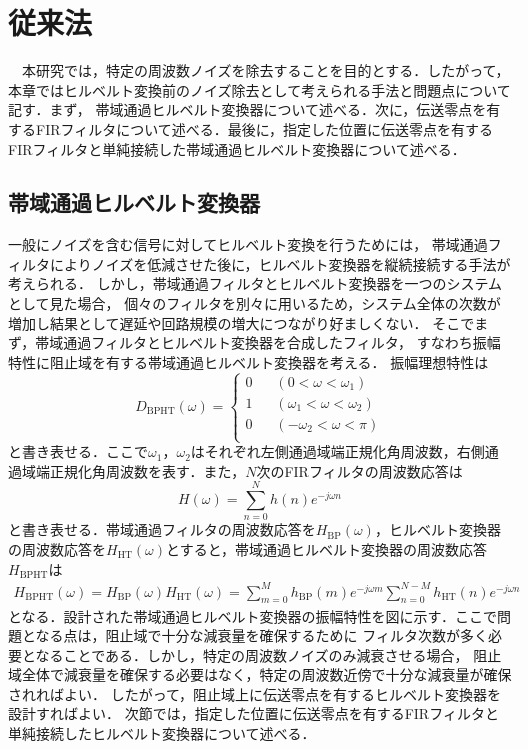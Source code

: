 \chapter{従来法}
　本研究では，特定の周波数ノイズを除去することを目的とする．したがって，本章ではヒルベルト変換前のノイズ除去として考えられる手法と問題点について記す．まず，%
帯域通過ヒルベルト変換器について述べる．次に，伝送零点を有するFIRフィルタについて述べる．最後に，指定した位置に伝送零点を有するFIRフィルタと単純接続した帯域通過ヒルベルト変換器について述べる．
\section{帯域通過ヒルベルト変換器}
一般にノイズを含む信号に対してヒルベルト変換を行うためには，
帯域通過フィルタによりノイズを低減させた後に，ヒルベルト変換器を縦続接続する手法が考えられる．
しかし，帯域通過フィルタとヒルベルト変換器を一つのシステムとして見た場合，
個々のフィルタを別々に用いるため，システム全体の次数が増加し結果として遅延や回路規模の増大につながり好ましくない．
そこでまず，帯域通過フィルタとヒルベルト変換器を合成したフィルタ，
すなわち振幅特性に阻止域を有する帯域通過ヒルベルト変換器を考える．
振幅理想特性は
\begin{equation}\label{ideal_fresp_HT}
D_{\mathrm{BPHT}}(\omega)=\begin{cases}
0\;\;\;&(0 <  \omega  < \omega_1)\\
1\;\;\;&(\omega_1 < \omega < \omega_2)\\
0\;\;\;&(-\omega_2 <  \omega  < \pi)\\
\end{cases}
\end{equation}
と書き表せる．ここで$\omega_1$，$\omega_2$はそれぞれ左側通過域端正規化角周波数，右側通過域端正規化角周波数を表す．また，$N$次のFIRフィルタの周波数応答は
\begin{equation}\label{FIRfresp}
H(\omega)=\sum_{n=0}^N{h(n)e^{-j{\omega}n}}
\end{equation}
と書き表せる．帯域通過フィルタの周波数応答を$H_{\mathrm{BP}}(\omega)$，ヒルベルト変換器の周波数応答を$H_{\mathrm{HT}}(\omega)$とすると，帯域通過ヒルベルト変換器の周波数応答$H_{\mathrm{BPHT}}$は
\begin{eqnarray}\label{BPHTfresp}
  H_{\mathrm{BPHT}}(\omega)=H_{\mathrm{BP}}(\omega)H_{\mathrm{HT}}(\omega)={\sum_{m=0}^{M}{h_{\mathrm{BP}}(m)e^{-j{\omega}m}}}{\sum_{n=0}^{N-M}{h_{\mathrm{HT}}(n)e^{-j{\omega}n}}}
\end{eqnarray}
となる．設計された帯域通過ヒルベルト変換器の振幅特性を図に示す．ここで問題となる点は，阻止域で十分な減衰量を確保するために
フィルタ次数が多く必要となることである．しかし，特定の周波数ノイズのみ減衰させる場合，
阻止域全体で減衰量を確保する必要はなく，特定の周波数近傍で十分な減衰量が確保されればよい．
したがって，阻止域上に伝送零点を有するヒルベルト変換器を設計すればよい．
次節では，指定した位置に伝送零点を有するFIRフィルタと単純接続したヒルベルト変換器について述べる．

